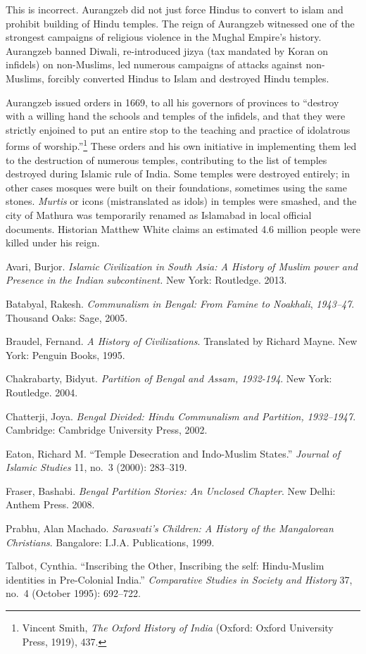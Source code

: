 This is incorrect. Aurangzeb did not just force Hindus to convert to islam and prohibit building of Hindu temples. The reign of Aurangzeb witnessed one of the strongest campaigns of religious violence in the Mughal Empire's history. Aurangzeb banned Diwali, re-introduced jizya (tax mandated by Koran on infidels) on non-Muslims, led numerous campaigns of attacks against non-Muslims, forcibly converted Hindus to Islam and destroyed Hindu temples.

Aurangzeb issued orders in 1669, to all his governors of provinces to “destroy with a willing hand the schools and temples of the infidels, and that they were strictly enjoined to put an entire stop to the teaching and practice of idolatrous forms of worship.”\footnote{Vincent Smith, \textit{The Oxford History of India} (Oxford: Oxford University Press, 1919), 437.} These orders and his own initiative in implementing them led to the destruction of numerous temples, contributing to the list of temples destroyed during Islamic rule of India. Some temples were destroyed entirely; in other cases mosques were built on their foundations, sometimes using the same stones. \textit{Murtis} or icons (mistranslated as idols) in temples were smashed, and the city of Mathura was temporarily renamed as Islamabad in local official documents. Historian Matthew White claims an estimated 4.6 million people were killed under his reign. 

\begin{thebibliography}{99}
 Avari, Burjor. \textit{Islamic Civilization in South Asia: A History of Muslim power and Presence in the Indian subcontinent.} New York: Routledge. 2013.

 Batabyal, Rakesh. \textit{Communalism in Bengal: From Famine to Noakhali}, \textit{1943--47}. Thousand Oaks: Sage, 2005. 

 Braudel, Fernand. \textit{A History of Civilizations}. Translated by Richard Mayne. New York: Penguin Books, 1995.

 Chakrabarty, Bidyut. \textit{Partition of Bengal and Assam, 1932-194}. New York: Routledge. 2004. 

 Chatterji, Joya. \textit{Bengal Divided: Hindu Communalism and Partition, 1932--1947}. Cambridge: Cambridge University Press, 2002.

 Eaton, Richard M. “Temple Desecration and Indo-Muslim States.” \textit{Journal of Islamic Studies} 11, no.\ 3 (2000): 283--319.

 Fraser, Bashabi. \textit{Bengal Partition Stories: An Unclosed Chapter}. New Delhi: Anthem Press. 2008. 

 Prabhu, Alan Machado. \textit{Sarasvati's Children: A History of the Mangalorean Christians}. Bangalore: I.J.A. Publications, 1999.

 Talbot, Cynthia. “Inscribing the Other, Inscribing the self: Hindu-Muslim identities in Pre-Colonial India.” \textit{Comparative Studies in Society and History} 37, no.\ 4 (October 1995): 692--722.
\end{thebibliography}
